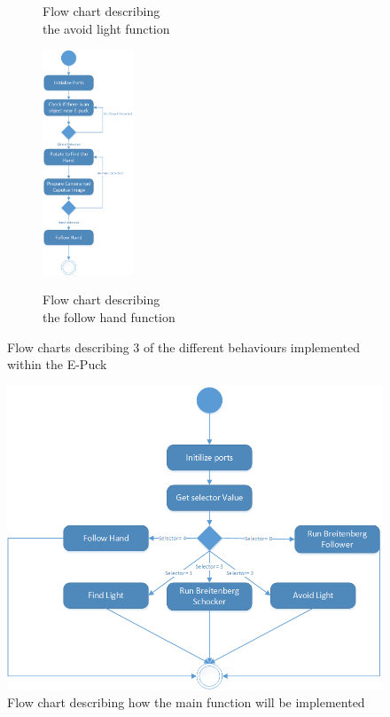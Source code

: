 \begin{figure}
\begin{subfigure}{0.45\textwidth}
		\label{fig:flowAvoidLight}
		\caption{Flow chart describing \\ the avoid light function}
	\end{subfigure}
	\begin{subfigure}{0.9\textwidth}
		\centering
		\includegraphics[width=0.3\textwidth]{figures/FollowHand.png}
		\label{fig:flowFollowHand}
		\caption{Flow chart describing \\ the follow hand function}
	\end{subfigure}
\caption{Flow charts describing 3 of the different behaviours implemented within the E-Puck}
\label{fig:flowBehav}
\end{figure}

\begin{figure}
\centering
\includegraphics{figures/Main.png}
\caption{Flow chart describing how the main function will be implemented}
\label{fig:flowMain}
\end{figure}
